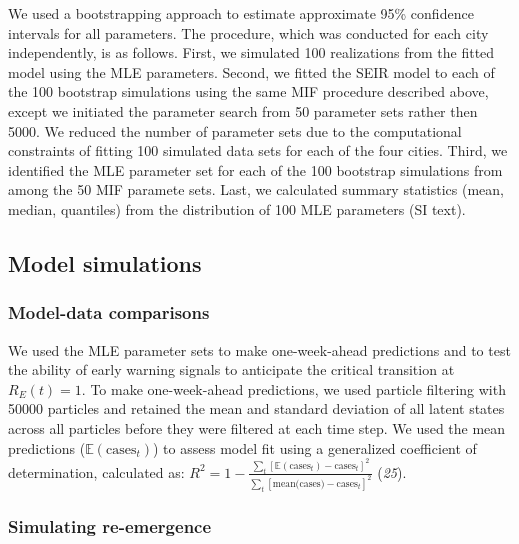 \documentclass[3p]{elsarticle} %
\begin{document}
We used a bootstrapping approach to estimate approximate 95\% confidence
intervals for all parameters. The procedure, which was conducted for
each city independently, is as follows. First, we simulated 100
realizations from the fitted model using the MLE parameters. Second, we
fitted the SEIR model to each of the 100 bootstrap simulations using the
same MIF procedure described above, except we initiated the parameter
search from 50 parameter sets rather then 5000. We reduced the number of
parameter sets due to the computational constraints of fitting 100
simulated data sets for each of the four cities. Third, we identified
the MLE parameter set for each of the 100 bootstrap simulations from
among the 50 MIF paramete sets. Last, we calculated summary statistics
(mean, median, quantiles) from the distribution of 100 MLE parameters
(SI text).

\hypertarget{model-simulations}{%
\subsection{Model simulations}\label{model-simulations}}

\hypertarget{model-data-comparisons}{%
\subsubsection{Model-data comparisons}\label{model-data-comparisons}}

We used the MLE parameter sets to make one-week-ahead predictions and to
test the ability of early warning signals to anticipate the critical
transition at \(R_E(t) = 1\). To make one-week-ahead predictions, we
used particle filtering with 50000 particles and retained the mean and
standard deviation of all latent states across all particles before they
were filtered at each time step. We used the mean predictions
(\(\mathbb{E}(\text{cases}_t)\)) to assess model fit using a generalized
coefficient of determination, calculated as:
\(R^2 = 1 - \frac{\sum_t [\mathbb{E}(\text{cases}_t) - \text{cases}_t]^2}{\sum_t [\text{mean(cases)}-\text{cases}_t]^2}\)
(\emph{25}).

\hypertarget{simulating-re-emergence}{%
\subsubsection{Simulating re-emergence}\label{simulating-re-emergence}}
\end{document}

